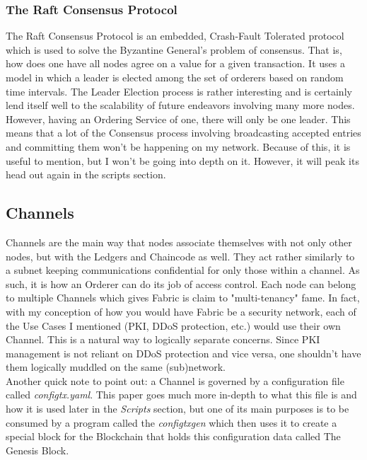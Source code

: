 		\subsubsection{The Raft Consensus Protocol}
			\hspace{10mm}The Raft Consensus Protocol is an embedded, Crash-Fault Tolerated protocol which is used to solve the Byzantine General's problem of consensus. That is, how does one have all nodes agree on a value for a given transaction. It uses a model in which a leader is elected among the set of orderers based on random time intervals. The Leader Election process is rather interesting and is certainly lend itself well to the scalability of future endeavors involving many more nodes. However, having an Ordering Service of one, there will only be one leader. This means that a lot of the Consensus process involving broadcasting accepted entries and committing them won't be happening on my network. Because of this, it is useful to mention, but I won't be going into depth on it. However, it will peak its head out again in the scripts section.\\
			
	\subsection{Channels}
		\hspace{10mm} Channels are the main way that nodes associate themselves with not only other nodes, but with the Ledgers and Chaincode as well. They act rather similarly to a subnet keeping communications confidential for only those within a channel. As such, it is how an Orderer can do its job of access control. Each node can belong to multiple Channels which gives Fabric is claim to "multi-tenancy" fame. In fact, with my conception of how you would have Fabric be a security network, each of the Use Cases I mentioned (PKI, DDoS protection, etc.) would use their own Channel. This is a natural way to logically separate concerns. Since PKI management is not reliant on DDoS protection and vice versa, one shouldn't have them logically muddled on the same (sub)network.\\
		
		\hspace{10mm}Another quick note to point out: a Channel is governed by a configuration file called \textit{configtx.yaml}. This paper goes much more in-depth to what this file is and how it is used later in the \textit{Scripts} section, but one of its main purposes is to be consumed by a program called the \textit{configtxgen} which then uses it to create a special block for the Blockchain that holds this configuration data called The Genesis Block.\\
		
